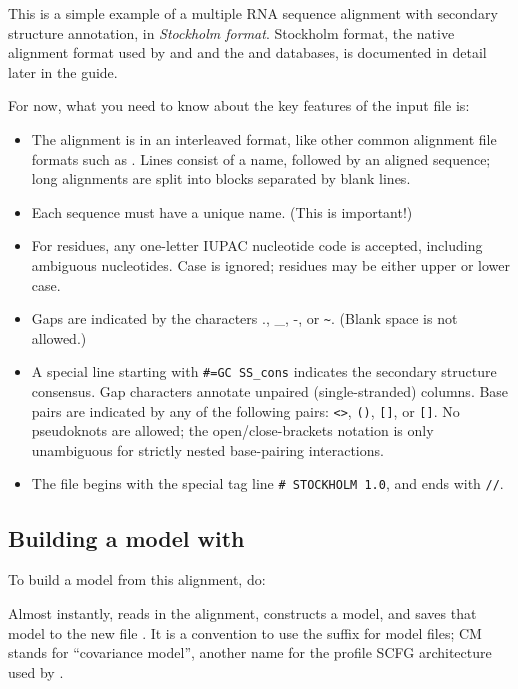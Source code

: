 This is a simple example of a multiple RNA sequence alignment with
secondary structure annotation, in \emph{Stockholm format}. Stockholm
format, the native alignment format used by  and
 and the  and 
databases, is documented in detail later in the guide.

For now, what you need to know about the key features of the input file is:
\begin{itemize}
\item The alignment is in an interleaved format, like other
common alignment file formats such as .
Lines consist of a name, followed by an aligned sequence;
long alignments are split into blocks separated by blank lines.
\item Each sequence must have a unique name. (This is important!)
\item For residues, any one-letter IUPAC nucleotide code is accepted,
      including ambiguous nucleotides. Case is ignored; residues
      may be either upper or lower case.
\item Gaps are indicated by the characters ., \_, -, or \verb+~+.
      (Blank space is not allowed.)
\item A special line starting with {\small\verb+#=GC SS_cons+} indicates
      the secondary structure consensus. Gap characters annotate
      unpaired (single-stranded) columns. Base pairs are indicated
      by any of the following pairs: \verb+<>+, \verb+()+, \verb+[]+,
      or \verb+[]+. No pseudoknots are allowed; the
      open/close-brackets notation is only unambiguous for strictly
      nested base-pairing interactions.
\item The file begins with the special tag line
      {\small\verb+# STOCKHOLM 1.0+}, and ends with {\small\verb+//+}.
\end{itemize}

\subsection{Building a model with }

To build a model from this alignment, do:


Almost instantly,  reads in the alignment, constructs a
model, and saves that model to the new file . It is a
convention to use the  suffix for model files; CM stands for
``covariance model'', another name for the profile SCFG architecture
used by  \cite{Eddy94}.


